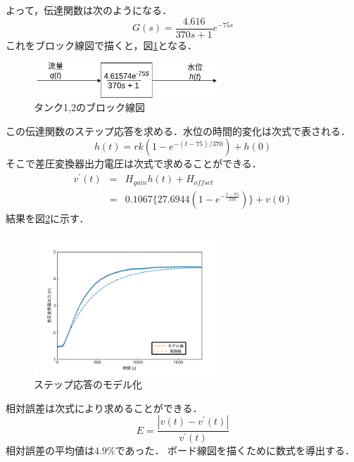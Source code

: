 \documentclass[12pt]{jsarticle}
\begin{document}
よって，伝達関数は次のようになる．
\begin{equation}
  \label{}
  G(s) = \frac{4.616}{370s+1}e^{-75s}
\end{equation}
これをブロック線図で描くと，図\ref{Tank_BlockDiag}となる．
\begin{figure}[tb]
  \begin{center}
    \includegraphics[clip,width=7.0cm]{../img/Tank_BlockDiag.png}
    \caption{タンク1,2のブロック線図}
    \label{Tank_BlockDiag}
  \end{center}
\end{figure}

この伝達関数のステップ応答を求める．水位の時間的変化は次式で表される．
\begin{equation}
  \label{}
  h(t) = rk(1 - e^{-(t - 75)/370}) + h(0)
\end{equation}
そこで差圧変換器出力電圧は次式で求めることができる．
\begin{eqnarray}
  \label{}
  v^{\prime}(t) &=& H_{gain}h(t) + H_{offset} \\
  &=& 0.1067\{27.6944(1-e^{-\frac{t-75}{370}})\} + v(0)
\end{eqnarray}
結果を図\ref{StepResponseModeling}に示す．
\begin{figure}[tb]
  \begin{center}
    \includegraphics[clip,width=7.0cm]{../graph/stepResponse_approximity.png}
    \caption{ステップ応答のモデル化}
    \label{StepResponseModeling}
  \end{center}
\end{figure}
相対誤差は次式により求めることができる．
\begin{equation}
  E = \frac{|v(t) - v^{\prime}(t)|}{v^{\prime}(t)}
\end{equation}
相対誤差の平均値は$4.9\%$であった．
ボード線図を描くために数式を導出する．%
\end{document}
